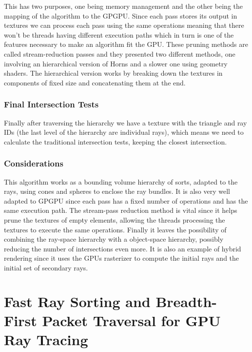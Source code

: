 \medskip

This has two purposes, one being memory management and the other being the mapping of the algorithm to the GPGPU. Since each pass stores its output in textures we can process each pass using the same operations meaning that there won't be threads having different execution paths which in turn is one of the features necessary to make an algorithm fit the GPU. These pruning methods are called stream-reduction passes and they presented two different methods, one involving an hierarchical version of Horns \cite{GPUGems2} and a slower one using geometry shaders. The hierarchical version works by breaking down the textures in components of fixed size and concatenating them at the end.

\subsubsection{Final Intersection Tests}	

Finally after traversing the hierarchy we have a texture with the triangle and  ray IDs (the last level of the hierarchy are individual rays), which means we need to calculate the traditional intersection tests, keeping the closest intersection.

\subsubsection{Considerations}

This algorithm works as a bounding volume hierarchy of sorts, adapted to the rays, using cones and spheres to enclose the ray bundles. It is also very well adapted to GPGPU since each pass has a fixed number of operations and has the same execution path. The stream-pass reduction method is vital since it helps prune the textures of empty elements, allowing the threads processing the textures to execute the same operations. Finally it leaves the possibility of combining the ray-space hierarchy with a object-space hierarchy, possibly reducing the number of intersections even more. It is also an example of hybrid rendering since it uses the GPUs rasterizer to compute the initial rays and the initial set of secondary rays.

\section{Fast Ray Sorting and Breadth-First Packet Traversal for GPU Ray Tracing}
\label{section:backgroud_garanzha10}

